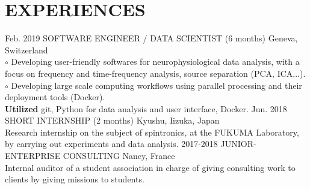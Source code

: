 \documentclass[]{cv-style}
\begin{document}
\section{EXPERIENCES}
\begin{entrylist}
%
\entry
{Feb. 2019}
{SOFTWARE ENGINEER / DATA SCIENTIST (6 months)}
{Geneva, Switzerland}
{\\
    $\circ$ Developing user-friendly softwares for neurophysiological data
    analysis, with a focus on frequency and time-frequency analysis, source
    separation (PCA, ICA...).\\
    $\circ$ Developing large scale computing workflows using parallel 
    processing and their deployment tools (Docker).\\
\textbf{Utilized} git, Python for data analysis and user interface, Docker.
\vspace{0.2cm}
}
\entry
{Jun. 2018}
{SHORT INTERNSHIP (2 months)}
{Kyushu, Iizuka, Japan}
{\\
    Research internship on the subject of spintronics, at the FUKUMA
    Laboratory, by carrying out experiments and data analysis.
\vspace{0.2cm}
}
\entry
{2017-2018}
{JUNIOR-ENTERPRISE CONSULTING}
{Nancy, France}
{\\
    Internal auditor of a student association in charge of giving consulting
    work to clients by giving missions to students.\\
\vspace{0.2cm}
}
%
\end{entrylist}
\newpage
\hphantom\\
%
\end{document}
